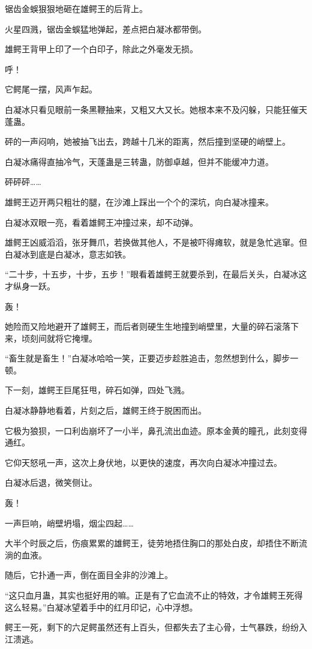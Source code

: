 \begin{this_body}
锯齿金蜈狠狠地砸在雄鳄王的后背上。

火星四溅，锯齿金蜈猛地弹起，差点把白凝冰都带倒。

雄鳄王背甲上印了一个白印子，除此之外毫发无损。

呼！

它鳄尾一摆，风声乍起。

白凝冰只看见眼前一条黑鞭抽来，又粗又大又长。她根本来不及闪躲，只能狂催天蓬蛊。

砰的一声闷响，她被抽飞出去，跨越十几米的距离，然后撞到坚硬的峭壁上。

白凝冰痛得直抽冷气，天蓬蛊是三转蛊，防御卓越，但并不能缓冲力道。

砰砰砰……

雄鳄王迈开两只粗壮的腿，在沙滩上踩出一个个的深坑，向白凝冰撞来。

白凝冰双眼一亮，看着雄鳄王冲撞过来，却不动弹。

雄鳄王凶威滔滔，张牙舞爪，若换做其他人，不是被吓得瘫软，就是急忙逃窜。但白凝冰到底是白凝冰，意志如铁。

“二十步，十五步，十步，五步！”眼看着雄鳄王就要杀到，在最后关头，白凝冰这才纵身一跃。

轰！

她险而又险地避开了雄鳄王，而后者则硬生生地撞到峭壁里，大量的碎石滚落下来，顷刻间就将它掩埋。

“畜生就是畜生！”白凝冰哈哈一笑，正要迈步趁胜追击，忽然想到什么，脚步一顿。

下一刻，雄鳄王巨尾狂甩，碎石如弹，四处飞溅。

白凝冰静静地看着，片刻之后，雄鳄王终于脱困而出。

它极为狼狈，一口利齿崩坏了一小半，鼻孔流出血迹。原本金黄的瞳孔，此刻变得通红。

它仰天怒吼一声，这次上身伏地，以更快的速度，再次向白凝冰冲撞过去。

白凝冰后退，微笑侧让。

轰！

一声巨响，峭壁坍塌，烟尘四起……

大半个时辰之后，伤痕累累的雄鳄王，徒劳地捂住胸口的那处白皮，却捂住不断流淌的血液。

随后，它扑通一声，倒在面目全非的沙滩上。

“这只血月蛊，其实也挺好用的嘛。正是有了它血流不止的特效，才令雄鳄王死得这么轻易。”白凝冰望着手中的红月印记，心中浮想。

鳄王一死，剩下的六足鳄虽然还有上百头，但都失去了主心骨，士气暴跌，纷纷入江溃逃。


\end{this_body}
